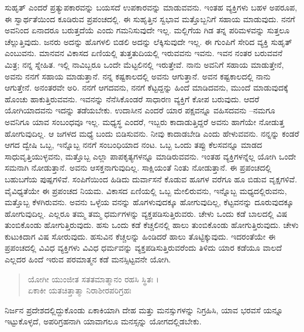 ಸುಹೃತ್ ಎಂದರೆ ಪ್ರತ್ಯುಪಕಾರವನ್ನು ಬಯಸದೆ ಉಪಕಾರವನ್ನು ಮಾಡುವವನು. ಇಂತಹ ವ್ಯಕ್ತಿಗಳು ಬಹಳ ಅಪರೂಪ, ಈ ಸ್ವಾರ್ಥತೆಯಿಂದ ಕೂಡಿರುವ ಪ್ರಪಂಚದಲ್ಲಿ. ಈ ಸುಹೃತ್ತಿನ ಸ್ವಭಾವ ಮತ್ತೊಬ್ಬನಿಗೆ ಸಹಾಯ ಮಾಡುವುದು. ನನಗೆ ಅವನಿಂದ ಏನಾದರೂ ಬರುತ್ತದೆಯೆ ಎಂದು ಗಮನಿಸುವುದೇ ಇಲ್ಲ. ಮಲ್ಲಿಗೆಯ ಗಿಡ ತನ್ನ ಪರಿಮಳವನ್ನು ಸುತ್ತಲೂ ಚೆಲ್ಲುತ್ತಿವುದು. ಜನರು ಅದನ್ನು ಹೊಗಳಲಿ ಬಿಡಲಿ ಅದನ್ನು ಲೆಕ್ಕಿಸುವುದೇ ಇಲ್ಲ. ಈ ಗುಂಪಿಗೆ ಸೇರಿದ ವ್ಯಕ್ತಿ ಸುಹೃತ್ ಎಂಬುವನು. ಮಾನವನ ವಿಕಾಸದ ಏಣಿಯಲ್ಲಿ ತುತ್ತತುದಿಯಲ್ಲಿ ಇರುವವನು ಇವನು. ಇವನ ನಂತರ ಬರುವವನೆ ಮಿತ್ರ; ನನ್ನ ಸ್ನೇಹಿತ. ಇಲ್ಲಿ ನಾವಿಬ್ಬರೂ ಒಂದೇ ಮೆಟ್ಟಲಿನಲ್ಲಿ ಇರುತ್ತೇವೆ. ನಾನು ಅವನಿಗೆ ಸಹಾಯ ಮಾಡುತ್ತೇನೆ, ಅವನು ನನಗೆ ಸಹಾಯ ಮಾಡುತ್ತಾನೆ. ನನ್ನ ಕಷ್ಟಕಾಲದಲ್ಲಿ ಅವನು ಆಗುತ್ತಾನೆ. ಅವನ ಕಷ್ಟಕಾಲದಲ್ಲಿ ನಾನು ಆಗುತ್ತೇನೆ. ಅನಂತರವೇ ಅರಿ. ನನಗೆ ಆಗದವನು, ನನಗೆ ಕೆಟ್ಟದ್ದನ್ನು ಹಿಂದೆ ಮಾಡಿದವನು, ಮುಂದೆ ಮಾಡುವುದಕ್ಕೆ ಹೊಂಚು ಹಾಕುತ್ತಿರುವವನು. ಇವನನ್ನು ನೆನೆಸಿಕೊಂಡರೆ ಸಾಧಾರಣ ವ್ಯಕ್ತಿಗೆ ಕೋಪ ಬರುವುದು. ಆದರೆ ಯೋಗಿಯಾದವನು ಇದನ್ನು ತಡೆಯಬೇಕು. ಉದಾಸೀನ ಎಂದರೆ ಯಾರ ಪಕ್ಷವನ್ನೂ ವಹಿಸದವನು –ನಮಗೂ ಅವನಿಗೂ ಯಾವ ಸಂಬಂಧವೂ ಇಲ್ಲ. ಮಧ್ಯಸ್ಥ ಎಂದರೆ, ಇಬ್ಬರು ಕಾದಾಡುತ್ತಿದ್ದರೆ ಅವನು ಹಾಗೆಯೇ ನೋಡುತ್ತ ಹೋಗುವುದಿಲ್ಲ. ಆ ಜಗಳದ ಮಧ್ಯೆ ಬಂದು ಬಿಡಿಸುವನು. ನೀವು ಕಾದಾಡಬೇಡಿ ಎಂದು ಹೇಳುವವನು. ನನ್ನನ್ನು ಕಂಡರೆ ಆಗದ ದ್ವೇಷಿ ಒಬ್ಬ, ಇನ್ನೊಬ್ಬ ನನಗೆ ಸಂಬಂಧಿಯಾದ ನಂಟ. ಒಬ್ಬ ಒಂದು ತಪ್ಪು ಕೆಲಸವನ್ನೂ ಮಾಡದ ಸಾಧುವೃತ್ತಿಯುಳ್ಳವನು, ಮತ್ತೊಬ್ಬ ಎಲ್ಲಾ ಪಾಪಕೃತ್ಯಗಳನ್ನೂ ಮಾಡಿರುವವನು. ಇಂತಹ ವ್ಯಕ್ತಿಗಳನ್ನೆಲ್ಲ ಯೋಗಿ ಒಂದೇ ಸಮನಾಗಿ ನೋಡುತ್ತಾನೆ. ಅವನು ಆಸಕ್ತನಾಗುವುದಿಲ್ಲ. ಸಾಕ್ಷಿಯಂತೆ ನಿಂತು ನೋಡುತ್ತಾನೆ. ಈ ಪ್ರಪಂಚದಲ್ಲಿ ಬಹುಬಗೆಯ ಪುಷ್ಪಗಳಿವೆ. ಸಂಪಿಗೆಯಿಂದ ಹಿಡಿದು ದುರ್ವಾಸನೆ ಕೊಡುವ ಹೂಗಳ ವರೆಗೂ ಹೂ ಬಿಡುವ ವೃಕ್ಷಗಳಿವೆ. ವೈವಿಧ್ಯತೆಯೇ ಈ ಪ್ರಪಂಚದ ನಿಯಮ. ವಿಕಾಸದ ಏಣಿಯಲ್ಲಿ ಒಬ್ಬ ಮೇಲಿರುವನು, ಇನ್ನೊಬ್ಬ ಮಧ್ಯದಲ್ಲಿರುವನು, ಮತ್ತೊಬ್ಬ ಕೆಳಗಿರುವನು. ಅವನು ಒಳ್ಳೆಯ ವನನ್ನು ಹೊಗಳುವುದಕ್ಕೂ ಹೋಗುವುದಿಲ್ಲ, ಕೆಟ್ಟವನನ್ನು ದೂರುವುದಕ್ಕೂ ಹೋಗುವುದಿಲ್ಲ. ಎಲ್ಲರೂ ತಮ್ಮ ತಮ್ಮ ಧರ್ಮಗಳನ್ನು ವ್ಯಕ್ತಪಡಿಸುತ್ತಿರುವರು. ಚೇಳು ಒಂದು ಕಡೆ ಬಾಲದಲ್ಲಿ ವಿಷ ತುಂಬಿಕೊಂಡು ಹೋಗುತ್ತಿರುವುದು. ಹಸು ಒಂದು ಕಡೆ ಕೆಚ್ಚಲಿನಲ್ಲಿ ಹಾಲು ತುಂಬಿಕೊಂಡು ಹೋಗುತ್ತಿರುವುದು. ಚೇಳು ಕುಟುಕಿದಾಗ ವಿಷ ಸೋರುವುದು. ಹಸುವಿನ ಕೆಚ್ಚಲನ್ನು ಹಿಂಡಿದರೆ ಹಾಲು ತೊಟ್ಟಿಕ್ಕುವುದು. ಇದರಂತೆಯೇ ಈ ಪ್ರಪಂಚದಲ್ಲಿ ವಿವಿಧ ವ್ಯಕ್ತಿಗಳು ವಿವಿಧ ಧರ್ಮವನ್ನು ವ್ಯಕ್ತಪಡಿಸುತ್ತಿರುವರೆಂದು ತಿಳಿದು ಯಾರ ಕಡೆಯೂ ವಾಲದೆ ಎಲ್ಲದರ ಹಿಂದೆ ಇರುವ ಪರಮಾತ್ಮನ ಕಡೆ ಮನಸ್ಸಿಟ್ಟವನೇ ಯೋಗಿ.

\begin{verse}
ಯೋಗೀ ಯುಂಜೀತ ಸತತಮಾತ್ಮಾನಂ ರಹಸಿ ಸ್ಥಿತಃ ।\\ಏಕಾಕೀ ಯತಚಿತ್ತಾತ್ಮಾ ನಿರಾಶೀರಪರಿಗ್ರಹಃ 
\end{verse}

{\small ನಿರ್ಜನ ಪ್ರದೇಶದಲ್ಲಿದ್ದುಕೊಂಡು ಏಕಾಕಿಯಾಗಿ ದೇಹ ಮತ್ತು ಮನಸ್ಸುಗಳನ್ನು ನಿಗ್ರಹಿಸಿ, ಯಾವ ಭರವಸೆ ಯನ್ನೂ ಇಟ್ಟುಕೊಳ್ಳದೆ, ಅಪರಿಗ್ರಹನಾಗಿ ಯಾವಾಗಲೂ ಮನಸ್ಸನ್ನು ಯೋಗದಲ್ಲಿಡಬೇಕು.}

